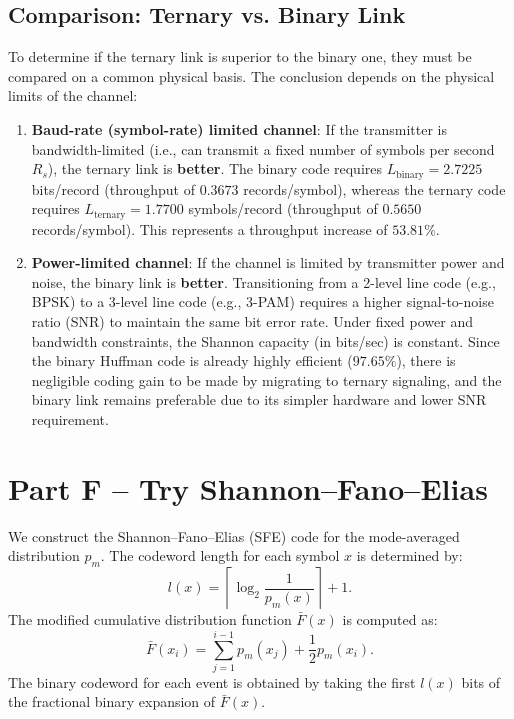\documentclass[11pt,a4paper]{article}
\begin{document}
\subsection{Comparison: Ternary vs. Binary Link}

To determine if the ternary link is superior to the binary one, they must be compared on a common physical basis. The conclusion depends on the physical limits of the channel:

\begin{enumerate}
    \item \textbf{Baud-rate (symbol-rate) limited channel}: 
    If the transmitter is bandwidth-limited (i.e., can transmit a fixed number of symbols per second \(R_s\)), the ternary link is \textbf{better}. The binary code requires \(L_{\mathrm{binary}} = 2.7225\) bits/record (throughput of \(0.3673\) records/symbol), whereas the ternary code requires \(L_{\mathrm{ternary}} = 1.7700\) symbols/record (throughput of \(0.5650\) records/symbol). This represents a throughput increase of \(\boxed{53.81\%}\).
    
    \item \textbf{Power-limited channel}: 
    If the channel is limited by transmitter power and noise, the binary link is \textbf{better}. Transitioning from a 2-level line code (e.g., BPSK) to a 3-level line code (e.g., 3-PAM) requires a higher signal-to-noise ratio (SNR) to maintain the same bit error rate. Under fixed power and bandwidth constraints, the Shannon capacity (in bits/sec) is constant. Since the binary Huffman code is already highly efficient (\(97.65\%\)), there is negligible coding gain to be made by migrating to ternary signaling, and the binary link remains preferable due to its simpler hardware and lower SNR requirement.
\end{enumerate}

\section{Part F -- Try Shannon--Fano--Elias}

We construct the Shannon--Fano--Elias (SFE) code for the mode-averaged distribution $p_m$. The codeword length for each symbol $x$ is determined by:
\begin{equation}
    l(x) = \left\lceil \log_2 \frac{1}{p_m(x)} \right\rceil + 1.
\end{equation}
The modified cumulative distribution function $\bar{F}(x)$ is computed as:
\begin{equation}
    \bar{F}(x_i) = \sum_{j=1}^{i-1} p_m(x_j) + \frac{1}{2} p_m(x_i).
\end{equation}
The binary codeword for each event is obtained by taking the first $l(x)$ bits of the fractional binary expansion of $\bar{F}(x)$.
\end{document}
